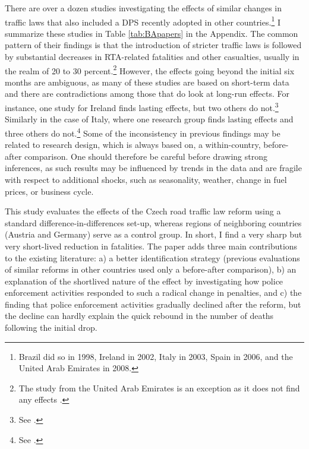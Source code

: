 \documentclass[12pt]{article}
\begin{document}
There are over a dozen studies investigating the effects of similar changes in
traffic laws that also included a DPS recently adopted in other
countries.\footnote{Brazil did so in 1998, Ireland in 2002, Italy in 2003, Spain
  in 2006, and the United Arab Emirates in 2008. } I summarize these studies in
Table \ref{tab:BApapers} in the Appendix. The common pattern of their findings
is that the introduction of stricter traffic laws is followed by substantial
decreases in RTA-related fatalities and other casualties, usually in the realm
of 20 to 30 percent.\footnote{The study from the United Arab Emirates is an
  exception as it does not find any effects \autocite{mehmood_evaluating_2010}.}
However, the effects going beyond the initial six months are ambiguous, as many
of these studies are based on short-term data and there are contradictions among
those that do look at long-run effects.  For instance, one study for Ireland
finds lasting effects, but two others do not.\footnote{See
  \textcite{butler_trends_2006,healy_speed_2004,hussain_speeding_2006}.} Similarly
in the case of Italy, where one research group finds lasting effects and three
others do not.\footnote{See
  \textcite{nicita_rational_2009,farchi_evaluation_2007,istat_instituto_nazionale_di_statistica_statistica_2005,zambon_evidence-based_2007,zambon_sustainability_2008}.}
Some of the inconsistency in previous findings may be related to research
design, which is always based on, a within-country, before-after comparison. One
should therefore be careful before drawing strong inferences, as such results
may be influenced by trends in the data and are fragile with respect to
additional shocks, such as seasonality, weather, change in fuel prices, or
business cycle.  

This study evaluates the effects of the Czech road traffic law reform using a
standard difference-in-differences set-up, whereas regions of neighboring
countries (Austria and Germany) serve as a control group. In short, I find a
very sharp but very short-lived reduction in fatalities. The paper adds three
main contributions to the existing literature: a) a better identification
strategy (previous evaluations of similar reforms in other countries used only a
before-after comparison), b) an explanation of the shortlived nature of the
effect by investigating how police enforcement activities responded to such a
radical change in penalties, and c) the finding that police enforcement
activities gradually declined after the reform, but the decline can hardly
explain the quick rebound in the number of deaths following the initial drop.
\end{document}
